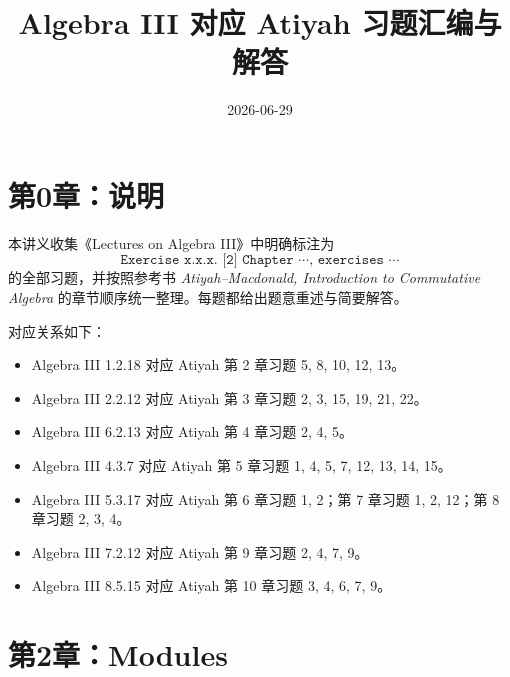 \documentclass[a4paper]{ctexart}
\title{Algebra III 对应 Atiyah 习题汇编与解答}
\author{}
\date{2026-06-29}
\begin{document}
\maketitle
\tableofcontents

\section*{第0章：说明}
{}

本讲义收集《Lectures on Algebra III》中明确标注为
\[
\texttt{Exercise x.x.x. [2] Chapter \(\cdots\), exercises \(\cdots\)}
\]
的全部习题，并按照参考书
\textit{Atiyah--Macdonald, Introduction to Commutative Algebra}
的章节顺序统一整理。每题都给出题意重述与简要解答。

对应关系如下：
\begin{itemize}
  \item Algebra III 1.2.18 对应 Atiyah 第 2 章习题 5, 8, 10, 12, 13。
  \item Algebra III 2.2.12 对应 Atiyah 第 3 章习题 2, 3, 15, 19, 21, 22。
  \item Algebra III 6.2.13 对应 Atiyah 第 4 章习题 2, 4, 5。
  \item Algebra III 4.3.7 对应 Atiyah 第 5 章习题 1, 4, 5, 7, 12, 13, 14, 15。
  \item Algebra III 5.3.17 对应 Atiyah 第 6 章习题 1, 2；第 7 章习题 1, 2, 12；第 8 章习题 2, 3, 4。
  \item Algebra III 7.2.12 对应 Atiyah 第 9 章习题 2, 4, 7, 9。
  \item Algebra III 8.5.15 对应 Atiyah 第 10 章习题 3, 4, 6, 7, 9。
\end{itemize}

\section{第2章：Modules}
\end{document}
